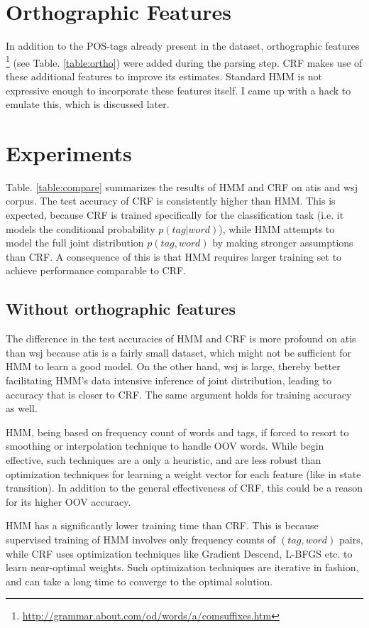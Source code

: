 \documentclass{sig-alternate-05-2015}
\begin{document}
\section{Orthographic Features}
In addition to the POS-tags already present in the dataset, orthographic features \footnote{\url{http://grammar.about.com/od/words/a/comsuffixes.htm}} (see Table. \ref{table:ortho}) were added during the parsing step. CRF makes use of these additional features to improve its estimates. Standard HMM is not expressive enough to incorporate these features itself. I came up with a hack to emulate this, which is discussed later.

\section{Experiments}
Table. \ref{table:compare} summarizes the results of HMM and CRF on atis and wsj corpus. The test accuracy of CRF is consistently higher than HMM. This is expected, because CRF is trained specifically for the classification task (i.e. it models the conditional probability $p(tag|word)$), while HMM attempts to model the full joint distribution $p(tag, word)$ by making stronger assumptions than CRF. A consequence of this is that HMM requires larger training set to achieve performance comparable to CRF.

\subsection{Without orthographic features}
The difference in the test accuracies of HMM and CRF is more profound on atis than wsj because atis is a fairly small dataset, which might not be sufficient for HMM to learn a good model. On the other hand, wsj is large, thereby better facilitating HMM's data intensive inference of joint distribution, leading to accuracy that is closer to CRF. The same argument holds for training accuracy as well.

HMM, being based on frequency count of words and tags, if forced to resort to smoothing or interpolation technique to handle OOV words. While begin effective, such techniques are a only a heuristic, and are less robust than optimization techniques for learning a weight vector for each feature (like in state transition). In addition to the general effectiveness of CRF, this could be a reason for its higher OOV accuracy.

HMM has a significantly lower training time than CRF. This is because supervised training of HMM involves only frequency counts of $(tag, word)$ pairs, while CRF uses optimization techniques like Gradient Descend, L-BFGS etc. to learn near-optimal weights. Such optimization techniques are iterative in fashion, and can take a long time to converge to the optimal solution.
\end{document}
